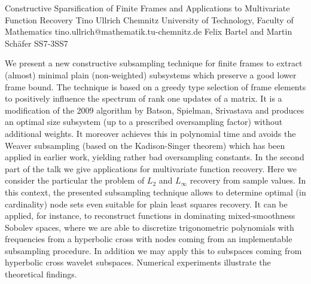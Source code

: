 \begin{talk}
{Constructive Sparsification of Finite Frames and Applications to Multivariate Function Recovery}
{Tino Ullrich}
{Chemnitz University of Technology, Faculty of Mathematics}
{tino.ullrich@mathematik.tu-chemnitz.de}
{Felix Bartel and Martin Sch\"afer}
{}{}{SS7-3}{SS7}

 

We present a new constructive subsampling technique for finite frames to extract (almost) minimal plain (non-weighted) subsystems which preserve a good lower frame bound. The technique is based on a greedy type selection of frame elements to positively influence the spectrum of rank one updates of a matrix. It is a modification of the 2009 algorithm by Batson, Spielman, Srivastava and produces an optimal size subsystem (up to a prescribed oversampling factor) without additional weights. It moreover achieves this in polynomial time and avoids the Weaver subsampling (based on the Kadison-Singer theorem) which has been applied in earlier work, yielding rather bad oversampling constants. In the second part of the talk we give applications for multivariate function recovery. Here we consider the particular the problem of $L_2$ and $L_\infty$ recovery from sample values. In this context, the presented subsampling technique allows to determine optimal (in cardinality) node sets even suitable for plain least squares recovery. It can be applied, for instance, to reconstruct functions in dominating mixed-smoothness Sobolev spaces, where we are able to discretize trigonometric polynomials with frequencies from a hyperbolic cross with nodes coming from an implementable subsampling procedure. In addition we may apply this to subspaces coming from hyperbolic cross wavelet subspaces. Numerical experiments illustrate the theoretical findings. 
\end{talk}

